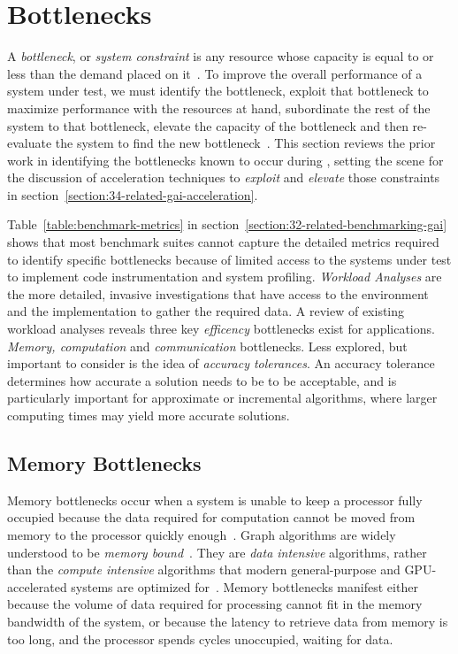 \section{\gai Bottlenecks}
\label{section:33-related-gai-bottlenecks}

A \textit{bottleneck}, or \textit{system constraint} is any resource whose capacity is equal to or less than the demand placed on it~\cite{Goldratt2004}. 
To improve the overall performance of a system under test, we must identify the bottleneck, exploit that bottleneck to maximize performance with the resources at hand, subordinate the rest of the system to that bottleneck, elevate the capacity of the bottleneck and then re-evaluate the system to find the new bottleneck~\cite{Goldratt1990}.
This section reviews the prior work in identifying the bottlenecks known to occur during \gai, setting the scene for the discussion of acceleration techniques to \textit{exploit} and \textit{elevate} those constraints in section~\ref{section:34-related-gai-acceleration}.

Table~\ref{table:benchmark-metrics} in section~\ref{section:32-related-benchmarking-gai} shows that most benchmark suites cannot capture the detailed metrics required to identify specific bottlenecks because of limited access to the systems under test to implement code instrumentation and system profiling.
\textit{Workload Analyses} are the more detailed, invasive investigations that have access to the environment and the implementation to gather the required data. 
A review of existing workload analyses reveals three key \textit{efficency} bottlenecks exist for \gai applications. 
\textit{Memory, computation} and \textit{communication} bottlenecks.
Less explored, but important to consider is the idea of \textit{accuracy tolerances}. 
An accuracy tolerance determines how accurate a solution needs to be to be acceptable, and is particularly important for approximate or incremental algorithms, where larger computing times may yield more accurate solutions.

\subsection{Memory Bottlenecks}
Memory bottlenecks occur when a system is unable to keep a processor fully occupied because the data required for computation cannot be moved from memory to the processor quickly enough~\cite{Hennessy2019}.
Graph algorithms are widely understood to be \textit{memory bound}~\cite{Beamer2015}. 
They are \textit{data intensive} algorithms, rather than the \textit{compute intensive} algorithms that modern general-purpose and GPU-accelerated systems are optimized for~\cite{Dysart2016}.
Memory bottlenecks manifest either because the volume of data required for processing cannot fit in the memory bandwidth of the system, or because the latency to retrieve data from memory is too long, and the processor spends cycles unoccupied, waiting for data.


